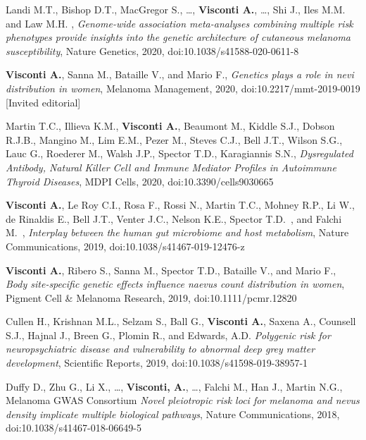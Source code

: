 \begin{itemize}
		 Landi M.T.\corresponding, Bishop D.T., MacGregor S., \dots, \textbf{Visconti A.}, \dots, Shi J., Iles M.M. and Law M.H. \corresponding, \emph{Genome-wide association meta-analyses combining multiple risk phenotypes provide insights into the genetic architecture of cutaneous melanoma susceptibility}, Nature Genetics, 2020, doi:10.1038/s41588-020-0611-8 %

		 \textbf{Visconti A.}\corresponding, Sanna M., Bataille V., and Mario F., \emph{Genetics plays a role in nevi distribution in women}, Melanoma Management, 2020, doi:10.2217/mmt-2019-0019 [Invited editorial] 

		 Martin T.C.\corresponding, Illieva K.M., \textbf{Visconti A.}, Beaumont M., Kiddle S.J., Dobson R.J.B., Mangino M., Lim E.M., Pezer M., Steves C.J., Bell J.T., Wilson S.G., Lauc G., Roederer M., Walsh J.P., Spector T.D.\colast, Karagiannis S.N.\colast, \emph{Dysregulated Antibody, Natural Killer Cell and Immune Mediator Profiles in Autoimmune Thyroid Diseases}, MDPI Cells, 2020, doi:10.3390/cells9030665 %
		
		 \textbf{Visconti A.}\cofirst, Le Roy C.I.\cofirst, Rosa F., Rossi N., Martin T.C., Mohney R.P., Li W., de Rinaldis E., Bell J.T., Venter J.C., Nelson K.E., Spector T.D.\colast ~\corresponding, and Falchi M.\colast ~\corresponding, \emph{Interplay between the human gut microbiome and host metabolism}, Nature Communications, 2019, doi:10.1038/s41467-019-12476-z %

		 \textbf{Visconti A.}\corresponding, Ribero S., Sanna M., Spector T.D., Bataille V., and Mario F.\corresponding, \emph{Body site-specific genetic effects influence naevus count distribution in women}, Pigment Cell \& Melanoma Research, 2019, doi:10.1111/pcmr.12820 %
		
		 Cullen H.\corresponding, Krishnan M.L., Selzam S., Ball G., \textbf{Visconti A.}, Saxena A., Counsell S.J., Hajnal J., Breen G., Plomin R., and Edwards, A.D. \emph{Polygenic risk for neuropsychiatric disease and vulnerability to abnormal deep grey matter development}, Scientific Reports, 2019, doi:10.1038/s41598-019-38957-1 %
				
		 Duffy D.\corresponding, Zhu G., Li X., \dots, \textbf{Visconti, A.}, \dots, Falchi M., Han J.\colast, Martin N.G.\colast, Melanoma GWAS Consortium \emph{Novel pleiotropic risk loci for melanoma and nevus density implicate multiple biological pathways}, Nature Communications, 2018, doi:10.1038/s41467-018-06649-5  %
		

\end{itemize}

